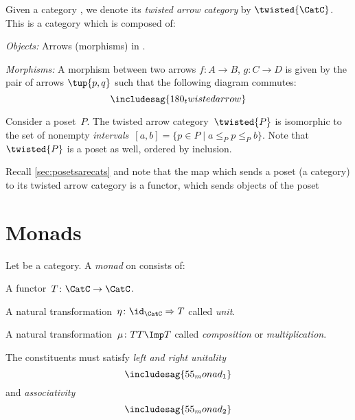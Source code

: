 




\begin{ctdefinition}
    Given a category \CatC, we denote its \emph{twisted arrow category} by $\twisted{\CatC}$. This is a category which is composed of:
    \begin{compactenum}
        \item \emph{Objects:} Arrows (morphisms) in \CatC.
        \item \emph{Morphisms:} A morphism between two arrows $f\colon A\to B$, $g\colon C\to D$ is given by the pair of arrows $\tup{p,q}$ such that the following diagram commutes:
        \begin{equation}
            \includesag{180_twistedarrow}
        \end{equation}
    \end{compactenum}
\end{ctdefinition}

\begin{example}[Intervals]
    Consider a poset~$P$. The twisted arrow category~$\twisted{P}$ is isomorphic to the set of nonempty \emph{intervals}~$[a,b]=\{p \in P\mid a\leq_P p \leq_P b\}$. Note that~$\twisted{P}$ is a poset as well, ordered by inclusion.
\end{example}
\begin{remark}
    Recall \cref{sec:posetsarecats} and note that the map which sends a poset (a category) to its twisted arrow category is a functor, which sends objects of the poset
\end{remark}


\section{Monads}

\begin{ctdefinition}[Monad]
    Let \CatC be a category. A \emph{monad} on \CatC consists of:
    \begin{compactenum}
        \item A functor~$T \colon \CatC \to \CatC$.
        \item A natural transformation~$\eta \colon \id_\CatC \Rightarrow T$ called \emph{unit}.
        \item A natural transformation~$\mu\colon TT\Imp T$ called \emph{composition} or \emph{multiplication}.
    \end{compactenum}
    The constituents must satisfy \emph{left and right unitality}
    \begin{equation}
        \includesag{55_monad_1}
    \end{equation}
    and \emph{associativity}
    \begin{equation}
        \includesag{55_monad_2}
    \end{equation}
\end{ctdefinition}


